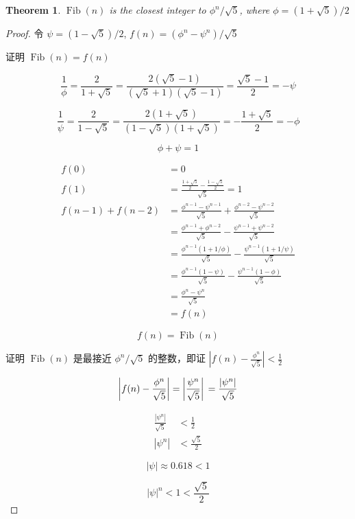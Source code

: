 \documentclass[fontset=founder]{ctexart}
\newtheorem{theorem}{Theorem}
\DeclareMathOperator{\Fib}{Fib}
\begin{document}
\begin{theorem}
    \(\Fib(n)\) is the closest integer to \(\phi^n / \sqrt{5}\), where \(\phi = (1 + \sqrt{5}) / 2\)
\end{theorem}

\begin{proof}
令 \(\psi = (1 - \sqrt 5) / 2\), \(f(n) = (\phi^n - \psi^n) / \sqrt 5\)

证明 \(\Fib(n) = f(n)\)

\[
\frac 1 \phi = \frac 2 {1 + \sqrt 5}
= \frac {2 (\sqrt 5 - 1)} {(\sqrt 5 + 1)(\sqrt 5 - 1)}
= \frac {\sqrt 5 - 1} 2 = -\psi
\]

\[
\frac 1 \psi = \frac 2 {1 - \sqrt 5}
= \frac {2(1 + \sqrt 5)} {(1 - \sqrt 5)(1 + \sqrt 5)} = - \frac {1 + \sqrt 5} 2 = -\phi
\]

\[
\phi + \psi = 1
\]

\[
\begin{aligned}
f(0) &= 0 \\
f(1) &= \frac {\frac {1 + \sqrt 5} 2 -  \frac {1 - \sqrt 5} 2} {\sqrt 5} = 1 \\
f(n - 1) + f(n - 2) &= \frac {\phi^{n - 1} - \psi^{n - 1}} {\sqrt 5} + \frac {\phi^{n - 2} - \psi^{n - 2}} {\sqrt 5} \\
&= \frac {\phi^{n - 1} + \phi^{n - 2}} {\sqrt 5} - \frac {\psi^{n - 1} + \psi^{n - 2}} {\sqrt 5} \\
&= \frac {\phi^{n-1}(1 +  1 / \phi)}{\sqrt 5} - \frac {\psi^{n-1}(1 +  1 / \psi)}{\sqrt 5} \\
&= \frac {\phi^{n-1}(1 - \psi)} {\sqrt 5} - \frac {\psi^{n-1}(1 - \phi)} {\sqrt 5} \\
&= \frac {\phi^n - \psi^n} {\sqrt 5} \\
&= f(n)
\end{aligned}
\]

\[
f(n) = \Fib(n)
\]

证明 \(\Fib(n)\) 是最接近 \(\phi^n / \sqrt 5\) 的整数，即证 \(\left| f(n) - \frac{\phi^n}{\sqrt 5}\right| < \frac 1 2\)

\[
\left| f(n) - \frac {\phi^n} {\sqrt 5} \right|
= \left| \frac {\psi^n} {\sqrt 5}  \right| \\
= \frac {\left| \psi^n \right|} {\sqrt 5}
\]

\[
\begin{aligned}
\frac {\left| \psi^n \right|} {\sqrt 5} &< \frac 1 2 \\
\left| \psi^n \right| &< \frac {\sqrt 5} 2
\end{aligned}
\]

\[
\left| \psi \right| \approx 0.618 < 1
\]

\[
\left| \psi \right|^n < 1 < \frac {\sqrt 5} 2
\]

\end{proof}
\end{document}
